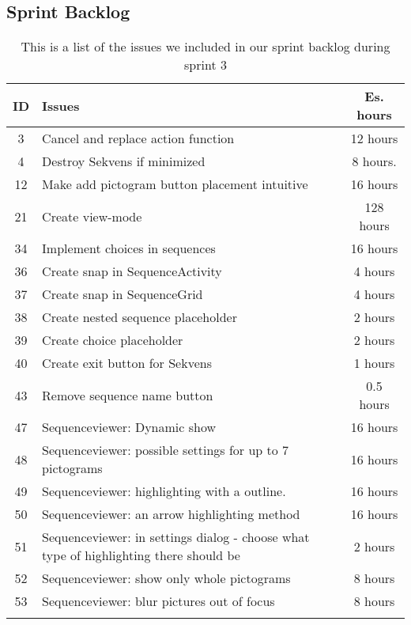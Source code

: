 \subsection{Sprint Backlog}\label{subsec:spr3_sprblog}
\begin{longtable} { | c | p{12cm} | c | } 
\hline
	ID 	&	Issues	&	Es. hours  \\\hline
	3	& 	Cancel and replace action function	&	12 hours \\\hline
	4	&	Destroy Sekvens if minimized	&	8 hours.	\\\hline
	12	& 	Make add pictogram button placement intuitive	&	16 hours 	\\\hline
	21	& 	Create view-mode				&	128 hours	\\\hline
	34	&	Implement choices in sequences		& 	16 hours  \\\hline
	36	& 	Create snap in SequenceActivity		&	4 hours  \\\hline
	37	&	Create snap in SequenceGrid		& 	4 hours \\\hline
	38	& 	Create nested sequence placeholder 		&	2 hours\\\hline
	39	&	Create choice placeholder		 		&	2 hours \\\hline
	40	&	Create exit button for Sekvens	&	1 hours \\\hline
	43	&	Remove sequence name button			&	0.5 hours \\\hline
	47	&	Sequenceviewer: Dynamic show	 	&	16 hours \\\hline
	48	&	Sequenceviewer: possible settings for up to 7 pictograms	 & 	16 hours	\\\hline
	49	&	Sequenceviewer: highlighting with a outline.	  &	16 hours \\\hline
	50	&	Sequenceviewer: an arrow highlighting method	 &	16 hours \\\hline
	51	&	Sequenceviewer: in settings dialog - choose what type of highlighting there should be	 &	2 hours \\\hline
	52	&	Sequenceviewer: show only whole pictograms	&	8 hours	\\\hline
	53	&	Sequenceviewer: blur pictures out of focus		 &	8 hours \\\hline
\caption{This is a list of the issues we included in our sprint backlog during sprint 3}
\label{tab:spr3_sprintblog}
\end{longtable}